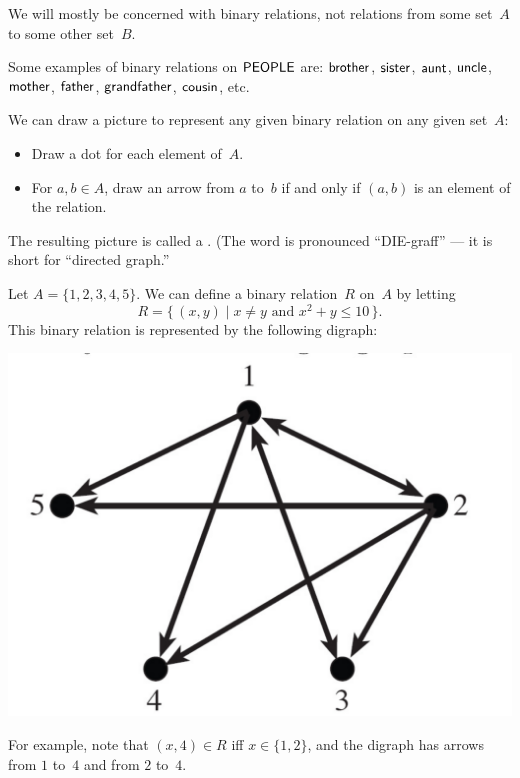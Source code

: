 We will mostly be concerned with binary relations, not relations from some set~$A$ to some other set~$B$.

\begin{eg} 
Some examples of binary relations on $\sf{PEOPLE}$ are:
$\sf{brother}$, $\sf{sister}$, $\sf{aunt}$, $\sf{uncle}$, $\sf{mother}$, $\sf{father}$, $\sf{grandfather}$, $\sf{cousin}$, etc.
 \end{eg}

\begin{defn} \label{digraph} 
We can draw a picture to represent any given binary relation on any given set~$A$:
	\begin{itemize}
	\item Draw a dot for each element of~$A$.
	\item For $a,b \in A$, draw an arrow from $a$ to~$b$ if and only if $(a,b)$ is an element of the relation.
	\end{itemize} 
The resulting picture is called a . (The word is pronounced ``DIE-graff'' --- it is short for ``directed graph.''
\end{defn}
 
 \begin{eg}
 Let $A =  \{1,2,3,4,5\}$. We can define a binary relation~$R$ on~$A$ by letting
 	\[ R = \{\, (x,y) \mid x \neq y \text{ and } x^2 + y \leq 10 \,\} .\]
This binary relation is represented by the following digraph:
\\ \centerline{\includegraphics[scale=0.4]{images/x2+y.pdf}}
For example, note that $(x,4) \in R$ iff $x \in \{1,2\}$, and the digraph has arrows from $1$ to~$4$ and from $2$ to~$4$.
\end{eg}

